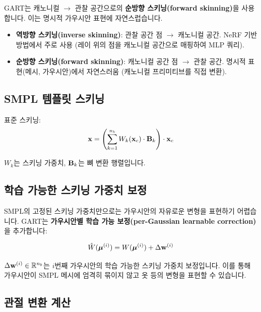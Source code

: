 \documentclass[11pt, a4paper]{report}
\begin{document}
GART는 캐노니컬 $\rightarrow$ 관찰 공간으로의 \textbf{순방향 스키닝(forward skinning)}을 사용합니다. 이는 명시적 가우시안 표현에 자연스럽습니다.

\begin{importantnote}[title={순방향 vs 역방향 스키닝}]
\begin{itemize}[leftmargin=*]
  \item \textbf{역방향 스키닝(inverse skinning)}: 관찰 공간 점 $\rightarrow$ 캐노니컬 공간. NeRF 기반 방법에서 주로 사용 (레이 위의 점을 캐노니컬 공간으로 매핑하여 MLP 쿼리).
  \item \textbf{순방향 스키닝(forward skinning)}: 캐노니컬 공간 점 $\rightarrow$ 관찰 공간. 명시적 표현(메시, 가우시안)에서 자연스러움 (캐노니컬 프리미티브를 직접 변환).
\end{itemize}
\end{importantnote}

\subsection{SMPL 템플릿 스키닝}

표준 스키닝:
\begin{equation}
\mathbf{x} = \left( \sum_{k=1}^{n_b} W_k(\mathbf{x}_c) \cdot \mathbf{B}_k \right) \cdot \mathbf{x}_c
\end{equation}

$W_k$는 스키닝 가중치, $\mathbf{B}_k$는 뼈 변환 행렬입니다.

\subsection{학습 가능한 스키닝 가중치 보정}

SMPL의 고정된 스키닝 가중치만으로는 가우시안의 자유로운 변형을 표현하기 어렵습니다. GART는 \textbf{가우시안별 학습 가능 보정(per-Gaussian learnable correction)}을 추가합니다:

\begin{equation}
\hat{W}(\bm{\mu}^{(i)}) = W(\bm{\mu}^{(i)}) + \Delta \mathbf{w}^{(i)}
\label{eq:weight_correction}
\end{equation}

$\Delta \mathbf{w}^{(i)} \in \mathbb{R}^{n_b}$는 $i$번째 가우시안의 학습 가능한 스키닝 가중치 보정입니다. 이를 통해 가우시안이 SMPL 메시에 엄격히 묶이지 않고 옷 등의 변형을 표현할 수 있습니다.

\subsection{관절 변환 계산}
\end{document}
